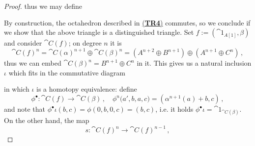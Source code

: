 \begin{prop}
\begin{proof}
        thus we may define
        \begin{center}
        \end{center}
        By construction, the octahedron described in \hyperref[TR4]{(\textbf{TR4})}
        commutes, so we conclude if we show that the above triangle is a distinguished triangle.
        Set $f := (\cat{1}_{A[1]},\beta)$ and consider $\cat{C}(f)$;
        on degree $n$ it is
        \begin{equation*}
            \cat{C}(f)^{n} = \cat{C}(\alpha)^{n+1} \oplus \cat{C}(\beta)^{n}
            = (A^{n+2} \oplus B^{n+1}) \oplus (A^{n+1} \oplus C^{n})\,,
        \end{equation*}
        thus we can embed $\cat{C}(\beta)^{n}=B^{n+1} \oplus C^{n}$ in it.
        This gives us a natural inclusion $\iota$ which fits in the commutative diagram
        \begin{center}
        \end{center}
        in which $\iota$ is a homotopy equivalence:
        define 
        \begin{equation*}
            \phi^{\bullet}:\cat{C}(f) \longrightarrow \cat{C}(\beta)\,, \quad
            \phi^{n}\big(a',b,a,c\big) = (\alpha^{n+1}(a) + b, c)\,,
        \end{equation*}
        and note that $\phi^{\bullet}\iota(b,c)=\phi(0,b,0,c) = (b,c)$, 
        i.e. it holds $\phi^{\bullet}\iota = \cat{1}_{\cat{C}(\beta)}$.
        On the other hand, the map
        \begin{equation*}
            s : \cat{C}(f)^{n} \longrightarrow \cat{C}(f)^{n-1}\,,

\end{equation*}
\end{proof}
\end{prop}

